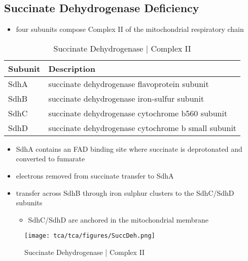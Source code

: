 \documentclass{scrartcl}
\begin{document}
\subsection{Succinate Dehydrogenase Deficiency}
\label{sec:org2122e51}
\begin{itemize}
\item four subunits compose Complex II of the mitochondrial respiratory chain
\end{itemize}

\begin{table}[htbp]
\caption{\label{tab:org99728dc}Succinate Dehydrogenase | Complex II}
\centering
\begin{tabular}{ll}
Subunit & Description\\
\hline
SdhA & succinate dehydrogenase flavoprotein subunit\\
SdhB & succinate dehydrogenase iron-sulfur subunit\\
SdhC & succinate dehydrogenase cytochrome b560 subunit\\
SdhD & succinate dehydrogenase cytochrome b small subunit\\
\end{tabular}
\end{table}

\begin{itemize}
\item SdhA contains an FAD binding site where succinate is deprotonated
and converted to fumarate
\end{itemize}


\begin{itemize}
\item electrons removed from succinate transfer to SdhA
\item transfer across SdhB through iron sulphur clusters to the SdhC/SdhD subunits
\begin{itemize}
\item SdhC/SdhD are anchored in the mitochondrial membrane
\end{itemize}
\end{itemize}

\begin{figure}[htbp]
\centering
\texttt{[image: tca/tca/figures/SuccDeh.png]}
\caption{\label{fig:orge45bb4c}Succinate Dehydrogenase | Complex II}
\end{figure}
\end{document}
